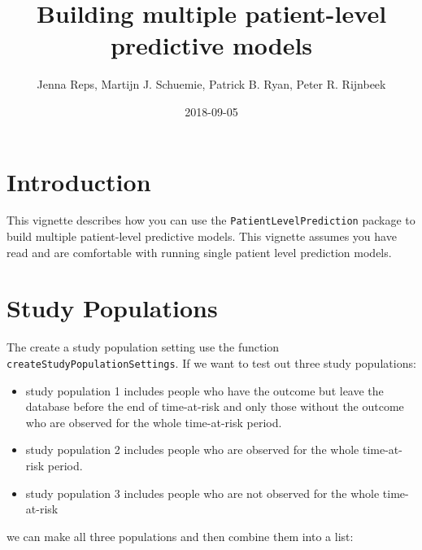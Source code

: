 \documentclass[]{article}
\title{Building multiple patient-level predictive models}
\author{Jenna Reps, Martijn J. Schuemie, Patrick B. Ryan, Peter R. Rijnbeek}
\date{2018-09-05}
\providecommand{\tightlist}{%
  \setlength{\itemsep}{0pt}\setlength{\parskip}{0pt}}
\begin{document}
\maketitle

{
\setcounter{tocdepth}{2}
\tableofcontents
}
\newpage

\section{Introduction}\label{introduction}

This vignette describes how you can use the
\texttt{PatientLevelPrediction} package to build multiple patient-level
predictive models. This vignette assumes you have read and are
comfortable with running single patient level prediction models.

\section{Study Populations}\label{study-populations}

The create a study population setting use the function
\texttt{createStudyPopulationSettings}. If we want to test out three
study populations:

\begin{itemize}
\tightlist
\item
  study population 1 includes people who have the outcome but leave the
  database before the end of time-at-risk and only those without the
  outcome who are observed for the whole time-at-risk period.
\item
  study population 2 includes people who are observed for the whole
  time-at-risk period.
\item
  study population 3 includes people who are not observed for the whole
  time-at-risk
\end{itemize}

we can make all three populations and then combine them into a list:
\end{document}
